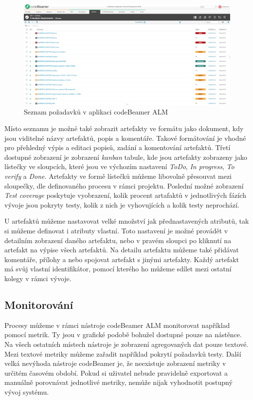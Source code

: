\documentclass[czech,master]{diploma}
\begin{document}
\begin{figure}[!ht]
    \centering
    \includegraphics[width=1\textwidth]{Diplomka/Figures/codebeamer_requirments.png}
    \caption{Seznam požadavků v aplikaci codeBeamer ALM}
    \label{fig:codebeamer_requirments}
\end{figure}

Místo seznamu je možné také zobrazit artefakty ve formátu jako dokument, kdy jsou viditelné názvy artefaktů, popis a komentáře. Takové formátování je vhodné pro přehledný výpis a editaci popisů, zadání a komentování artefaktů. Třetí dostupné zobrazení je zobrazení \textit{kanban} tabule, kde jsou artefakty zobrazeny jako lístečky ve sloupcích, které jsou ve výchozím nastavení \textit{ToDo}, \textit{In progress}, \textit{To verify} a \textit{Done}. Artefakty ve formě lístečků můžeme libovolně přesouvat mezi sloupečky, dle definovaného procesu v rámci projektu. Poslední možné zobrazení \textit{Test coverage} poskytuje vyobrazení, kolik procent artafaktů v jednotlivých fázích vývoje jsou pokryty testy, kolik z nich je vyhovujících a kolik testy neprochází.

U artefaktů můžeme nastavovat velké množství jak přednastavených atributů, tak si můžeme definovat i atributy vlastní. Toto nastavení je možné provádět v detailním zobrazení daného artefaktu, nebo v pravém sloupci po kliknutí na artefakt na výpise všech artefaktů. Na detailu artefaktu můžeme také přidávat komentáře, přílohy a nebo spojovat artefakt s jinými artefakty. Každý artefakt má svůj vlastní identifikátor, pomocí kterého ho můžeme sdílet mezi ostatní kolegy v rámci vývoje.

\subsection{Monitorování}
Procesy můžeme v rámci nástroje codeBeamer ALM monitorovat například pomocí metrik. Ty jsou v grafické podobě bohužel dostupné pouze na nástěnce. Na všech ostatních místech nástroje je zobrazení agregovaných dat pouze textové. Mezi textové metriky můžeme zařadit například pokrytí požadavků testy. Další velká nevýhoda nástroje codeBeamer je, že neexistuje zobrazení metriky v určitém časovém období. Pokud si uživatel nebude pravidelně exportovat a manuálně porovnávat jednotlivé metriky, nemůže nijak vyhodnotit postupný vývoj systému.
\end{document}
